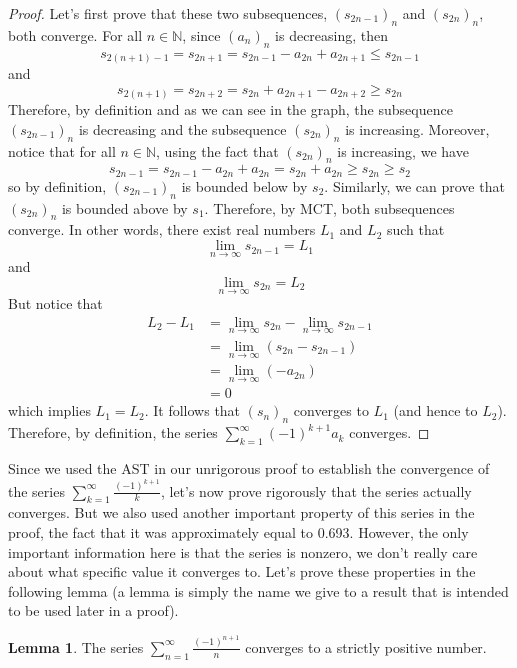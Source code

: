 \documentclass[10pt]{article}
\newcommand{\N}{\mathbb{N}}
\theoremstyle{definition}
\newtheorem{lemma}{Lemma}
\begin{document}
\begin{proof}
    Let's first prove that these two subsequences, $(s_{2n-1})_n$ and $(s_{2n})_n$, both converge. For all $n \in \N$, since $(a_n)_n$ is decreasing, then
    $$s_{2(n+1)-1} = s_{2n+1} = s_{2n-1} - a_{2n} + a_{2n+1} \leq s_{2n-1}$$
    and 
    $$s_{2(n+1)} = s_{2n + 2} = s_{2n} + a_{2n+1} - a_{2n+2} \geq s_{2n}$$
    Therefore, by definition and as we can see in the graph, the subsequence $(s_{2n -1})_n$ is decreasing and the subsequence $(s_{2n})_n$ is increasing. Moreover, notice that for all $n \in \N$, using the fact that $(s_{2n})_n$ is increasing, we have
    $$s_{2n-1} = s_{2n-1} - a_{2n} + a_{2n} = s_{2n} + a_{2n} \geq s_{2n} \geq s_2$$
    so by definition, $(s_{2n-1})_n$ is bounded below by $s_2$. Similarly, we can prove that $(s_{2n})_n$ is bounded above by $s_1$. Therefore, by MCT, both subsequences converge. In other words, there exist real numbers $L_1$ and $L_2$ such that
    $$\lim_{n \rightarrow \infty}s_{2n-1} = L_1$$
    and
    $$\lim_{n \rightarrow \infty}s_{2n} = L_2$$
    But notice that
    \begin{align*}
        L_2 - L_1 &= \lim_{n \rightarrow \infty}s_{2n} - \lim_{n \rightarrow \infty}s_{2n-1} \\
        &= \lim_{n \rightarrow \infty} (s_{2n} - s_{2n-1}) \\
        &= \lim_{n \rightarrow \infty} (-a_{2n}) \\
        &= 0
    \end{align*}
    which implies $L_1 = L_2$. It follows that $(s_n)_n$ converges to $L_1$ (and hence to $L_2$). Therefore, by definition, the series $\sum_{k=1}^{\infty}(-1)^{k+1}a_k$ converges.
\end{proof}

Since we used the AST in our unrigorous proof to establish the convergence of the series $\sum_{k=1}^{\infty}\frac{(-1)^{k+1}}{k}$, let's now prove rigorously that the series actually converges. But we also used another important property of this series in the proof, the fact that it was approximately equal to 0.693. However, the only important information here is that the series is nonzero, we don't really care about what specific value it converges to. Let's prove these properties in the following lemma (a lemma is simply the name we give to a result that is intended to be used later in a proof). 

\begin{lemma}
    The series $\sum_{n=1}^{\infty}\frac{(-1)^{n+1}}{n}$ converges to a strictly positive number.
\end{lemma}
\end{document}
